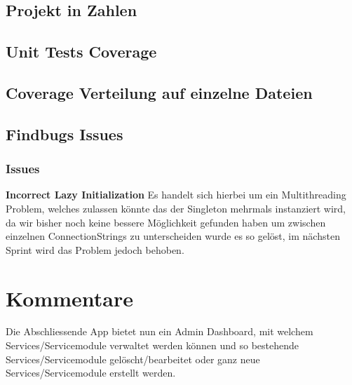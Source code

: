 \documentclass[11pt]{scrartcl}
\begin{document}
\subsection{Projekt in Zahlen}

\subsection{Unit Tests Coverage}

\subsection{Coverage Verteilung auf einzelne Dateien}

\subsection{Findbugs Issues}
\subsubsection{Issues}
\textbf{Incorrect Lazy Initialization}
\newline
Es handelt sich hierbei um ein Multithreading Problem, welches zulassen könnte 
das der Singleton mehrmals instanziert wird, da wir bisher noch keine bessere 
Möglichkeit gefunden haben um zwischen einzelnen ConnectionStrings zu 
unterscheiden wurde es so gelöst, im nächsten Sprint wird das Problem jedoch behoben.
\newline

\section{Kommentare}

Die Abschliessende App bietet nun ein Admin Dashboard, mit welchem 
Services/Servicemodule
verwaltet werden können und so bestehende Services/Servicemodule gelöscht/bearbeitet oder ganz 
neue Services/Servicemodule erstellt werden.
\newline
\end{document}
